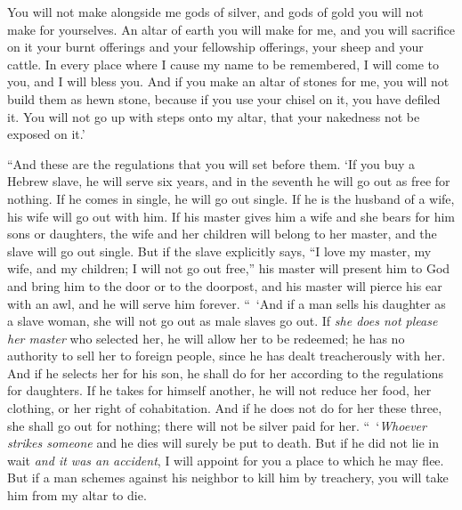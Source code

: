 \begin{biblechapter}
\verse You will not make alongside me gods of silver, and gods of gold you will not make for yourselves.
\verse An altar of earth you will make for me, and you will sacrifice on it your burnt offerings and your fellowship offerings, your sheep and your cattle. In every place where I cause my name to be remembered, I will come to you, and I will bless you.
\verse And if you make an altar of stones for me, you will not build them as hewn stone, because if you use your chisel on it, you have defiled it.
\verse You will not go up with steps onto my altar, that your nakedness not be exposed on it.’
\end{biblechapter}

\begin{biblechapter} %
 “And these are the regulations that you will set before them.
\verse ‘If you buy a Hebrew slave, he will serve six years, and in the seventh he will go out as free for nothing.
\verse If he comes in single, he will go out single. If he is the husband of a wife, his wife will go out with him.
\verse If his master gives him a wife and she bears for him sons or daughters, the wife and her children will belong to her master, and the slave will go out single.
\verse But if the slave explicitly says, “I love my master, my wife, and my children; I will not go out free,”
\verse his master will present him to God and bring him to the door or to the doorpost, and his master will pierce his ear with an awl, and he will serve him forever.
\verse “ ‘And if a man sells his daughter as a slave woman, she will not go out as male slaves go out.
\verse If \textit{she does not please her master} who selected her, he will allow her to be redeemed; he has no authority to sell her to foreign people, since he has dealt treacherously with her.
\verse And if he selects her for his son, he shall do for her according to the regulations for daughters.
\verse If he takes for himself another, he will not reduce her food, her clothing, or her right of cohabitation.
\verse And if he does not do for her these three, she shall go out for nothing; there will not be silver paid for her.
 “ ‘\textit{Whoever strikes someone} and he dies will surely be put to death.
\verse But if he did not lie in wait \textit{and it was an accident}, I will appoint for you a place to which he may flee.
\verse But if a man schemes against his neighbor to kill him by treachery, you will take him from my altar to die.

\end{biblechapter}
